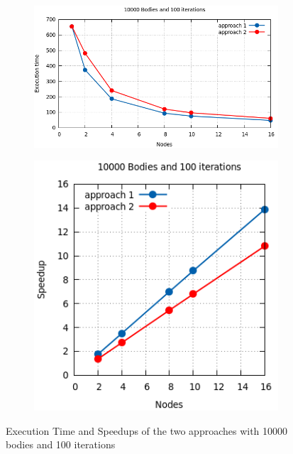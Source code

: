 \documentclass[a4paper]{article}
\begin{document}
\begin{figure}[ht]
\begin{subfigure}{.55\textwidth}
  \centering
  \includegraphics[width=1\linewidth]{results/graph2}
\end{subfigure} %
\begin{subfigure}{.35\textwidth}
  \centering
  \includegraphics[width=1\linewidth]{results/graph2_sp}
\end{subfigure}
  \caption{Execution Time and Speedups of the two approaches with 10000 bodies and 100 iterations}
  \label{fig:G2}
\end{figure}
\FloatBarrier
\end{document}
